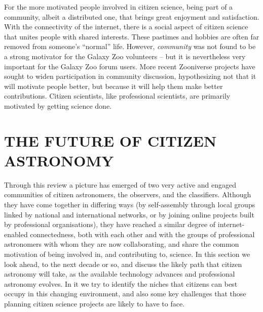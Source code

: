 \documentclass{ar2e}
\begin{document}
For the more motivated people involved in citizen science, being part of a
community,  albeit a distributed one, that brings great enjoyment and
satisfaction.  With the connectivity of the internet, there is a social  aspect
of citizen science that unites people with shared interests.   These pastimes
and hobbies are often far removed from someone's ``normal''  life. However, {\it
community} was not found to be a strong motivator for the Galaxy Zoo volunteers
-- but it is nevertheless very important for the Galaxy Zoo forum users. More
recent Zooniverse projects have sought to widen participation in community
discussion, hypothesizing not that it will motivate people better, but because
it will help them make better contributions. Citizen scientists, like
professional scientists, are primarily motivated by getting science done.



\section{THE FUTURE OF CITIZEN ASTRONOMY}
\label{sec:future}


Through this review a picture has emerged of two very active and engaged
communities of citizen astronomers, the observers, and the classifiers. 
Although they have come together in differing ways (by self-assembly through
local groups linked by national and international networks, or by joining online
projects built by professional organisations), they have reached a similar
degree of internet-enabled connectedness, both with each other and with the
groups of professional astronomers with whom they are now collaborating, and
share the common motivation of being involved in, and contributing to, science.
In this section we look ahead, to the next decade or so, and discuss the likely
path that citizen astronomy will take, as the available technology advances and
professional astronomy evolves. In it we try to identify the niches that
citizens can best occupy in this changing environment, and also some key
challenges that those planning citizen science projects are likely to have to
face.


\end{document}
